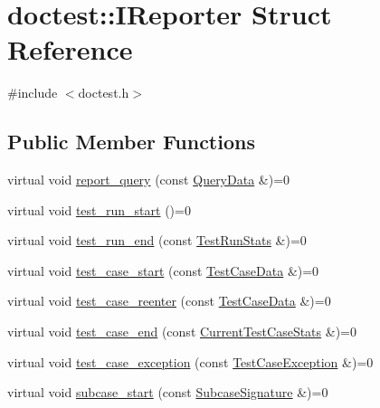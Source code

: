 \hypertarget{structdoctest_1_1_i_reporter}{}\section{doctest\+:\+:I\+Reporter Struct Reference}
\label{structdoctest_1_1_i_reporter}


{\ttfamily \#include $<$doctest.\+h$>$}

\subsection*{Public Member Functions}
\begin{DoxyCompactItemize}
\item 
virtual void \mbox{\hyperlink{structdoctest_1_1_i_reporter_ae7e30d1c2cd332094c66d39bf3a85e52}{report\+\_\+query}} (const \mbox{\hyperlink{structdoctest_1_1_query_data}{Query\+Data}} \&)=0
\item 
virtual void \mbox{\hyperlink{structdoctest_1_1_i_reporter_a7f4a4b654726d4b266c91cc0e1569f96}{test\+\_\+run\+\_\+start}} ()=0
\item 
virtual void \mbox{\hyperlink{structdoctest_1_1_i_reporter_a610495b7caa29e36b5ea62bff62952ed}{test\+\_\+run\+\_\+end}} (const \mbox{\hyperlink{structdoctest_1_1_test_run_stats}{Test\+Run\+Stats}} \&)=0
\item 
virtual void \mbox{\hyperlink{structdoctest_1_1_i_reporter_afa107df2d0230607e2f86f1876f48526}{test\+\_\+case\+\_\+start}} (const \mbox{\hyperlink{structdoctest_1_1_test_case_data}{Test\+Case\+Data}} \&)=0
\item 
virtual void \mbox{\hyperlink{structdoctest_1_1_i_reporter_a46c2fe41e5fa3d6930a3cb26d81ed764}{test\+\_\+case\+\_\+reenter}} (const \mbox{\hyperlink{structdoctest_1_1_test_case_data}{Test\+Case\+Data}} \&)=0
\item 
virtual void \mbox{\hyperlink{structdoctest_1_1_i_reporter_a43f8f19681dd5d42218ecb4fd935cda7}{test\+\_\+case\+\_\+end}} (const \mbox{\hyperlink{structdoctest_1_1_current_test_case_stats}{Current\+Test\+Case\+Stats}} \&)=0
\item 
virtual void \mbox{\hyperlink{structdoctest_1_1_i_reporter_a40b0cdf1ad59dabc736e35fde63d516f}{test\+\_\+case\+\_\+exception}} (const \mbox{\hyperlink{structdoctest_1_1_test_case_exception}{Test\+Case\+Exception}} \&)=0
\item 
virtual void \mbox{\hyperlink{structdoctest_1_1_i_reporter_a03ef82d6fb9afe8b0e3bbe24f28dd268}{subcase\+\_\+start}} (const \mbox{\hyperlink{structdoctest_1_1_subcase_signature}{Subcase\+Signature}} \&)=0

\end{DoxyCompactItemize}
